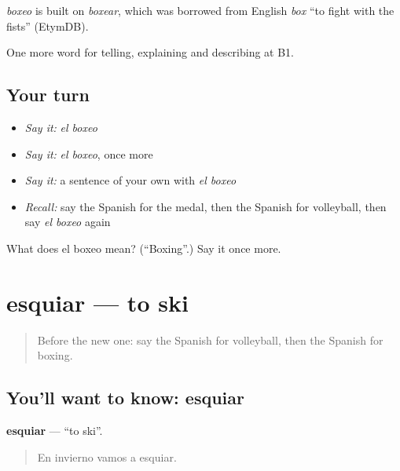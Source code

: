 \begin{cousinweb}
\emph{boxeo} is built on \emph{boxear}, which was borrowed from English \emph{box} \textquotedblleft{}to fight with the fists\textquotedblright{} (EtymDB).
\end{cousinweb}

\begin{grammarlens}[title={What you've built}]
One more word for telling, explaining and describing at B1.
\end{grammarlens}

\subsection*{Your turn}
\begin{itemize}
\raggedright
  \item \emph{Say it:} \emph{el boxeo}
  \item \emph{Say it:} \emph{el boxeo}, once more
  \item \emph{Say it:} a sentence of your own with \emph{el boxeo}
  \item \emph{Recall:} say the Spanish for the medal, then the Spanish for volleyball, then say \emph{el boxeo} again
\end{itemize}

\begin{tcolorbox}[breakable,colback=teal!4,colframe=teal!35!black,title={Before you move on}]
What does el boxeo mean? (\textquotedblleft{}Boxing\textquotedblright{}.) Say it once more.
\end{tcolorbox}
\section[esquiar]{esquiar — to ski}

\label{lesson:ES-C758-esquiar}



\begin{quote}
Before the new one: say the Spanish for volleyball, then the Spanish for boxing.
\end{quote}

\subsection*{You'll want to know: esquiar}
\textbf{esquiar} — \textquotedblleft{}to ski\textquotedblright{}.

\begin{quote}
En invierno vamos a esquiar.
\end{quote}

